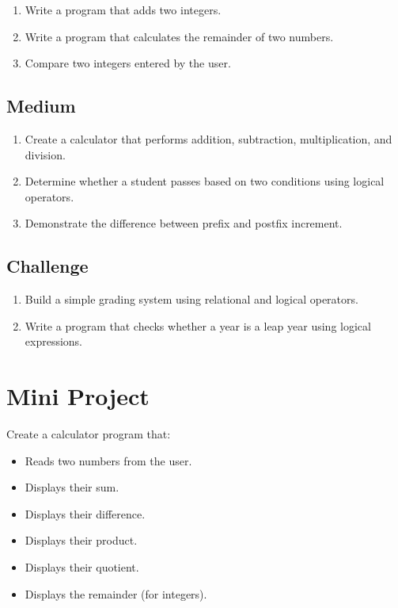 \documentclass[12pt,openany]{book}
\begin{document}
\begin{enumerate}
    \item Write a program that adds two integers.
    \item Write a program that calculates the remainder of two numbers.
    \item Compare two integers entered by the user.
\end{enumerate}

\subsection*{Medium}

\begin{enumerate}
    \item Create a calculator that performs addition, subtraction, multiplication, and division.
    \item Determine whether a student passes based on two conditions using logical operators.
    \item Demonstrate the difference between prefix and postfix increment.
\end{enumerate}

\subsection*{Challenge}

\begin{enumerate}
    \item Build a simple grading system using relational and logical operators.
    \item Write a program that checks whether a year is a leap year using logical expressions.
\end{enumerate}

\section{Mini Project}

Create a calculator program that:

\begin{itemize}
    \item Reads two numbers from the user.
    \item Displays their sum.
    \item Displays their difference.
    \item Displays their product.
    \item Displays their quotient.
    \item Displays the remainder (for integers).
\end{itemize}
\end{document}
